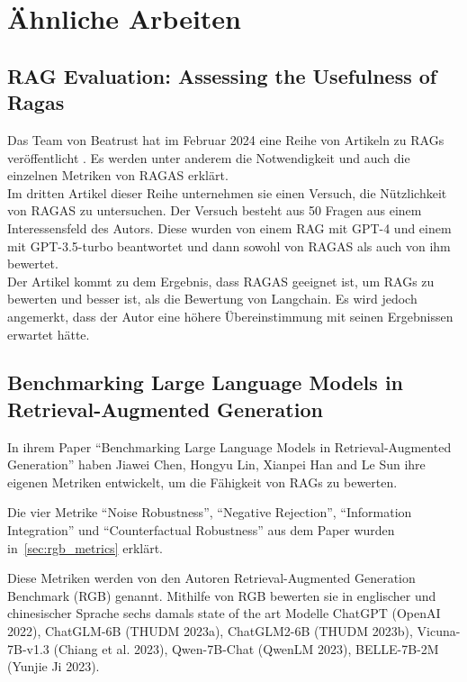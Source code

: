 \chapter{Ähnliche Arbeiten}

\section{RAG Evaluation: Assessing the Usefulness of Ragas}
Das Team von Beatrust hat im Februar 2024 eine Reihe von Artikeln zu RAGs veröffentlicht \cite{beatrust_ragas_2024}. Es werden unter anderem die Notwendigkeit und auch die einzelnen Metriken von RAGAS erklärt.\\
Im dritten Artikel dieser Reihe unternehmen sie einen Versuch, die Nützlichkeit von RAGAS zu untersuchen.
Der Versuch besteht aus 50 Fragen aus einem Interessensfeld des Autors. Diese wurden von einem RAG mit GPT-4 und einem mit GPT-3.5-turbo beantwortet und dann sowohl von RAGAS als auch von ihm bewertet.\\
Der Artikel kommt zu dem Ergebnis, dass RAGAS geeignet ist, um RAGs zu bewerten und besser ist, als die Bewertung von Langchain. Es wird jedoch angemerkt, dass der Autor eine höhere Übereinstimmung mit seinen Ergebnissen erwartet hätte.



\section{Benchmarking Large Language Models in Retrieval-Augmented Generation}
\label{sec:rgb}
In ihrem Paper \enquote{Benchmarking Large Language Models in Retrieval-Augmented Generation}\cite{2023arXiv230901431C} haben Jiawei Chen, Hongyu Lin, Xianpei Han and Le Sun ihre eigenen Metriken entwickelt, um die Fähigkeit von RAGs zu bewerten.

Die vier Metrike \enquote{Noise Robustness}, \enquote{Negative Rejection}, \enquote{Information Integration} und \enquote{Counterfactual Robustness} aus dem Paper wurden in~\ref{sec:rgb_metrics} erklärt.

Diese Metriken werden von den Autoren Retrieval-Augmented Generation Benchmark (RGB) genannt.
Mithilfe von RGB bewerten sie in englischer und chinesischer Sprache sechs damals state of the art Modelle ChatGPT (OpenAI 2022), ChatGLM-6B (THUDM 2023a), ChatGLM2-6B (THUDM 2023b), Vicuna-7B-v1.3 (Chiang et al. 2023), Qwen-7B-Chat (QwenLM 2023), BELLE-7B-2M (Yunjie Ji 2023).

